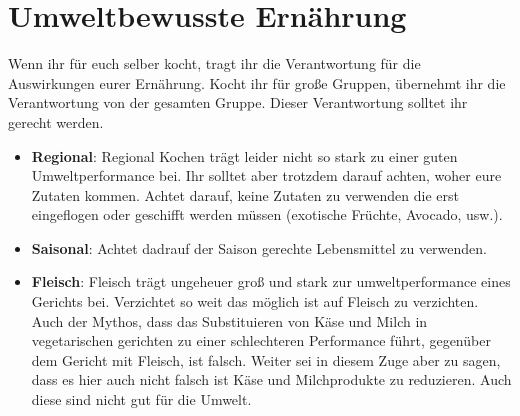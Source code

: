 \section{Umweltbewusste Ernährung}\label{sec:umweltbewusste-ernahrung}
Wenn ihr für euch selber kocht, tragt ihr die Verantwortung für die Auswirkungen eurer Ernährung.
Kocht ihr für große Gruppen, übernehmt ihr die Verantwortung von der gesamten Gruppe.
Dieser Verantwortung solltet ihr gerecht werden.


\begin{itemize}
    \item \textbf{Regional}: Regional Kochen trägt leider nicht so stark zu einer guten Umweltperformance bei.
    Ihr solltet aber trotzdem darauf achten, woher eure Zutaten kommen.
    Achtet darauf, keine Zutaten zu verwenden die erst eingeflogen oder geschifft werden müssen (exotische Früchte, Avocado, usw.).
    \item \textbf{Saisonal}: Achtet dadrauf der Saison gerechte Lebensmittel zu verwenden.
    \item \textbf{Fleisch}: Fleisch trägt ungeheuer groß und stark zur umweltperformance eines Gerichts bei.
    Verzichtet so weit das möglich ist auf Fleisch zu verzichten.
    Auch der Mythos, dass das Substituieren von Käse und Milch in vegetarischen gerichten zu einer schlechteren Performance führt, gegenüber dem Gericht mit Fleisch, ist falsch.
    Weiter sei in diesem Zuge aber zu sagen, dass es hier auch nicht falsch ist Käse und Milchprodukte zu reduzieren.
    Auch diese sind nicht gut für die Umwelt.
\end{itemize}
